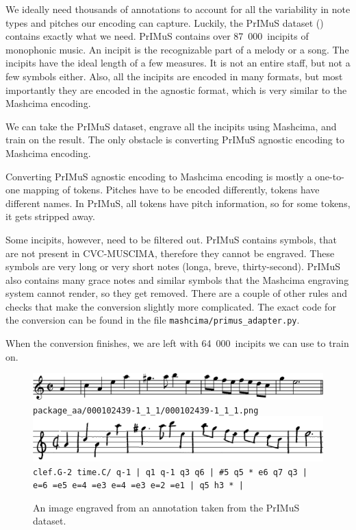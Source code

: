 We ideally need thousands of annotations to account for all the variability in note types and pitches our encoding can capture. Luckily, the PrIMuS dataset (\cite{Primus}) contains exactly what we need. PrIMuS contains over 87~000~incipits of monophonic music. An incipit is the recognizable part of a melody or a song. The incipits have the ideal length of a few measures. It is not an entire staff, but not a few symbols either. Also, all the incipits are encoded in many formats, but most importantly they are encoded in the agnostic format, which is very similar to the Mashcima encoding.

We can take the PrIMuS dataset, engrave all the incipits using Mashcima, and train on the result. The only obstacle is converting PrIMuS agnostic encoding to Mashcima encoding.

Converting PrIMuS agnostic encoding to Mashcima encoding is mostly a one-to-one mapping of tokens. Pitches have to be encoded differently, tokens have different names. In PrIMuS, all tokens have pitch information, so for some tokens, it gets stripped away.

Some incipits, however, need to be filtered out. PrIMuS contains symbols, that are not present in CVC-MUSCIMA, therefore they cannot be engraved. These symbols are very long or very short notes (longa, breve, thirty-second). PrIMuS also contains many grace notes and similar symbols that the Mashcima engraving system cannot render, so they get removed. There are a couple of other rules and checks that make the conversion slightly more complicated. The exact code for the conversion can be found in the file \verb`mashcima/`\allowbreak\verb`primus_`\allowbreak\verb`adapter.py`.

When the conversion finishes, we are left with 64~000~incipits we can use to train on.

\begin{figure}[h]
    \centering
    \includegraphics[width=140mm]{../img/primus-incipit-2}
    \verb`package_aa/000102439-1_1_1/000102439-1_1_1.png`
    \includegraphics[width=140mm]{../img/primus-incipit-2-engraved}
    \verb`clef.G-2 time.C/ q-1 | q1 q-1 q3 q6 | #5 q5 * e6 q7 q3 |`
    \verb`e=6 =e5 e=4 =e3 e=4 =e3 e=2 =e1 | q5 h3 * |`
    \caption{An image engraved from an annotation taken from the PrIMuS dataset.}
    \label{fig6:PrimusIncipit}
\end{figure}

